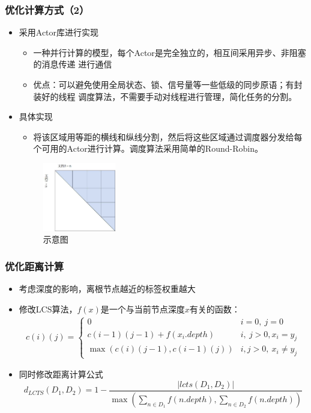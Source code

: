 \documentclass[11pt,presentation]{beamer}
\begin{document}
\begin{frame}
\frametitle{优化计算方式（2）}
\label{sec-3-5}
\begin{itemize}

\item 采用Actor库进行实现
\label{sec-3-5-1}%
\begin{itemize}
\item 一种并行计算的模型，每个Actor是完全独立的，相互间采用异步、非阻塞的消息传递
      进行通信
\item 优点：可以避免使用全局状态、锁、信号量等一些低级的同步原语；有封装好的线程
      调度算法，不需要手动对线程进行管理，简化任务的分割。
\end{itemize}

\item 具体实现
\label{sec-3-5-2}%
\begin{itemize}

\item 将该区域用等距的横线和纵线分割，然后将这些区域通过调度器分发给每个可用的Actor进行计算。调度算法采用简单的Round-Robin。
\label{sec-3-5-2-1}%
\end{itemize} %
\label{sec-3-5-2-2}

\begin{figure}[htb]
\centering
\includegraphics[width=0.3\textwidth,angle=0]{./图片1.jpg}
\caption{\label{fig:1}示意图}
\end{figure}
\end{itemize} %
\end{frame}
\begin{frame}
\frametitle{优化距离计算}
\label{sec-3-6}

\begin{itemize}
\item 考虑深度的影响，离根节点越近的标签权重越大
\item 修改LCS算法，\(f(x)\)是一个与当前节点深度\(x\)有关的函数：
     \begin{eqnarray*}
       c(i)(j) =
       \begin{cases}
         0 & i = 0,\: j = 0\\
         c(i-1)(j-1) + f(x_i.depth) & i,\: j > 0, x_i=y_j\\
         \max(c(i)(j-1), c(i-1)(j)) & i, j > 0,\: x_i \ne y_j
       \end{cases}
     \end{eqnarray*}
\item 同时修改距离计算公式
     \[
     d_{LCTS}(D_1,D_2)=1-\frac{|lcts(D_1,D_2)|}{\max(\sum\limits_{n\in
     D_1}{f(n.depth)},\sum\limits_{n\in D_2}{f(n.depth)})}
     \]
\end{itemize}
         
\end{frame}
\end{document}
